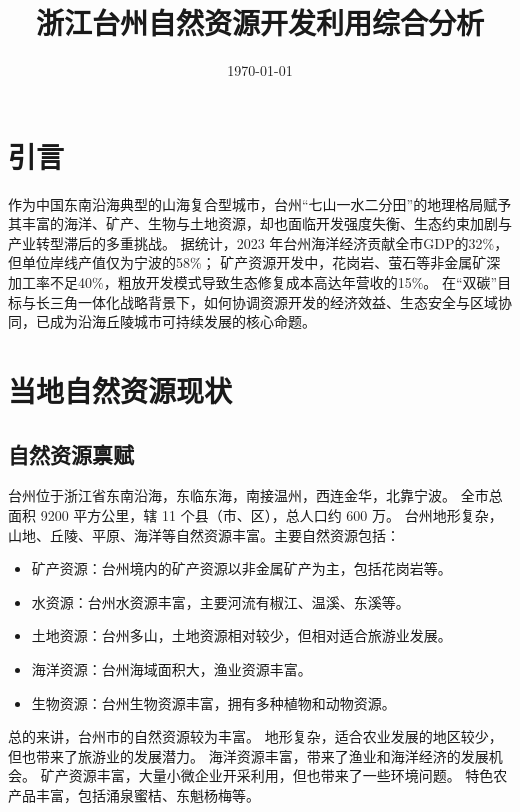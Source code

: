 \documentclass[11pt]{article}
\title{浙江台州自然资源开发利用综合分析}
\author{\Author}
\date{\today}
\begin{document}
\maketitle


\section{引言}\label{sec:introduction}

作为中国东南沿海典型的山海复合型城市，台州“七山一水二分田”的地理格局赋予其丰富的海洋、矿产、生物与土地资源，却也面临开发强度失衡、生态约束加剧与产业转型滞后的多重挑战。
据统计，2023 年台州海洋经济贡献全市GDP的32\%，但单位岸线产值仅为宁波的58\%；
矿产资源开发中，花岗岩、萤石等非金属矿深加工率不足40\%，粗放开发模式导致生态修复成本高达年营收的15\%。
在“双碳”目标与长三角一体化战略背景下，如何协调资源开发的经济效益、生态安全与区域协同，已成为沿海丘陵城市可持续发展的核心命题。

\section{当地自然资源现状}\label{sec:current-situation}

\subsection{自然资源禀赋}\label{subsec:resource-current-situation}

台州位于浙江省东南沿海，东临东海，南接温州，西连金华，北靠宁波。
全市总面积 9200 平方公里，辖 11 个县（市、区），总人口约 600 万。
台州地形复杂，山地、丘陵、平原、海洋等自然资源丰富。主要自然资源包括：

\begin{itemize}
  \item 矿产资源：台州境内的矿产资源以非金属矿产为主，包括花岗岩等。
  \item 水资源：台州水资源丰富，主要河流有椒江、温溪、东溪等。
  \item 土地资源：台州多山，土地资源相对较少，但相对适合旅游业发展。
  \item 海洋资源：台州海域面积大，渔业资源丰富。
  \item 生物资源：台州生物资源丰富，拥有多种植物和动物资源。
\end{itemize}

总的来讲，台州市的自然资源较为丰富。
地形复杂，适合农业发展的地区较少，但也带来了旅游业的发展潜力。
海洋资源丰富，带来了渔业和海洋经济的发展机会。
矿产资源丰富，大量小微企业开采利用，但也带来了一些环境问题。
特色农产品丰富，包括涌泉蜜桔、东魁杨梅等。
\end{document}
